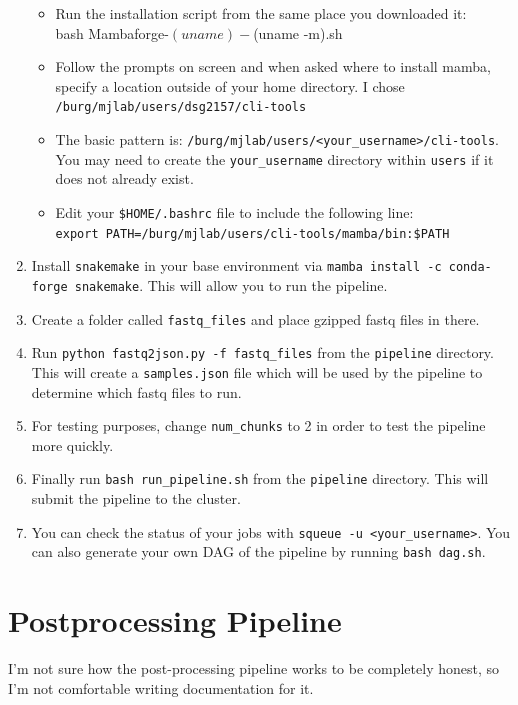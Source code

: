 \documentclass{article}
\begin{document}
\begin{enumerate}
\begin{itemize}
                \item Run the installation script from the same place you downloaded it: \\
                bash Mambaforge-$(uname)-$(uname -m).sh
                \item Follow the prompts on screen and when asked where to install mamba, specify a location outside of your home directory. I chose \texttt{/burg/mjlab/users/dsg2157/cli-tools} 
                \item The basic pattern is: \texttt{/burg/mjlab/users/<your\_username>/cli-tools}. 
                You may need to create the \texttt{your\_username} directory within \texttt{users} if it does not already exist.
                \item Edit your \texttt{\$HOME/.bashrc} file to include the following line: \\
                \texttt{export PATH=/burg/mjlab/users/cli-tools/mamba/bin:\$PATH}
            \end{itemize}
        \item Install \texttt{snakemake} in your base environment via \texttt{mamba install -c conda-forge snakemake}. This will allow you to run the pipeline.
        \item Create a folder called \texttt{fastq\_files} and place gzipped fastq files in there.
        \item Run \texttt{python fastq2json.py -f fastq\_files} from the \texttt{pipeline} directory. This will create a \texttt{samples.json} file which will be used by the pipeline to determine which fastq files to run.
        \item For testing purposes, change \texttt{num\_chunks} to 2 in order to test the pipeline more quickly. 
        \item Finally run \texttt{bash run\_pipeline.sh} from the \texttt{pipeline} directory. This will submit the pipeline to the cluster. 
        \item You can check the status of your jobs with \texttt{squeue -u <your\_username>}. You can also generate your own DAG of the pipeline by running \texttt{bash dag.sh}.
    \end{enumerate}

    \section{Postprocessing Pipeline}
    I'm not sure how the post-processing pipeline works to be completely honest, so I'm not comfortable writing documentation for it.
\end{document}
